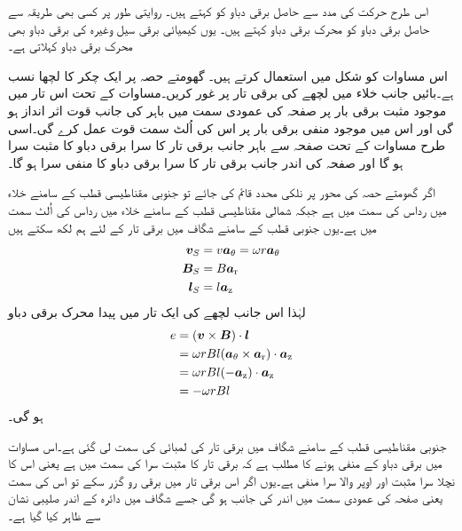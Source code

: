 اس طرح حرکت کی مدد سے حاصل برقی دباو کو   کہتے ہیں۔ روایتی طور پر کسی بھی طریقہ سے حاصل برقی دباو کو محرک برقی دباو کہتے ہیں۔ یوں کیمیائی برقی سیل وغیرہ کی برقی دباو بھی محرک برقی دباو کہلاتی  ہے۔

اس مساوات کو شکل  میں استعمال کرتے ہیں۔ گھومتے حصہ پر ایک چکر کا لچھا نسب ہے۔بائیں جانب خلاء میں لچھے کی برقی تار پر غور کریں۔مساوات   کے تحت اس تار میں موجود مثبت برقی بار پر صفحہ کی عمودی سمت میں باہر کی جانب قوت اثر انداز ہو گی اور اس میں موجود منفی برقی بار پر اس کی اُلٹ سمت قوت عمل کرے گی۔اسی طرح مساوات   کے تحت صفحہ سے باہر جانب برقی تار کا سرا برقی دباو   کا مثبت سرا ہو گا اور صفحہ کی اندر جانب برقی تار کا سرا برقی دباو  کا منفی سرا ہو گا۔

اگر گھومتے حصہ کی محور پر نلکی محدد قائم کی جائے تو جنوبی مقناطیسی قطب کے سامنے خلاء میں  رداس کی سمت میں ہے جبکہ شمالی مقناطیسی قطب کے سامنے  خلاء میں   رداس کی اُلٹ سمت میں ہے۔یوں جنوبی قطب کے سامنے شگاف میں برقی تار   کے لئے ہم لکھ سکتے ہیں
\begin{gather}
\begin{aligned}
{\ensuremath{{\boldsymbol{v}}}}_S&=v {\boldsymbol{a}}_{\theta} =\omega r {\boldsymbol{a}}_{\theta}\\
{{\boldsymbol{B}}}_S&=B {\boldsymbol{a}}_{\textup{r}}\\
{{\boldsymbol{l}}}_S&=l {\boldsymbol{a}}_{\textup{z}}
\end{aligned}
\end{gather}
لہٰذا اس جانب لچھے کی ایک تار میں پیدا محرک برقی دباو
\begin{gather}
\begin{aligned}
e&=({{\boldsymbol{v}}} \times {\ensuremath{{\boldsymbol{B}}}}) \cdot {\ensuremath{{\boldsymbol{l}}}}\\
&=\omega r B l  ({\boldsymbol{a}}_{\theta} \times {\boldsymbol{a}}_{\textup{r}}) \cdot {\boldsymbol{a}}_{\textup{z}}\\
&=\omega r B l  (-{\boldsymbol{a}}_{\textup{z}}) \cdot {\boldsymbol{a}}_{\textup{z}}\\
&=-\omega r B l 
\end{aligned}
\end{gather}
ہو گی۔

جنوبی مقناطیسی قطب کے سامنے شگاف میں برقی تار کی لمبائی کی سمت  لی گئی ہے۔اس مساوات میں برقی دباو کے منفی ہونے کا مطلب ہے کہ برقی تار کا مثبت سرا  کی سمت میں ہے یعنی اس کا نچلا سرا مثبت اور اوپر والا سرا منفی ہے۔یوں اگر اس برقی تار میں برقی رو گزر سکے تو اس کی سمت  یعنی صفحہ کی عمودی سمت میں اندر کی جانب ہو گی جسے شگاف میں دائرہ کے اندر صلیبی نشان سے ظاہر کیا گیا ہے۔ 

